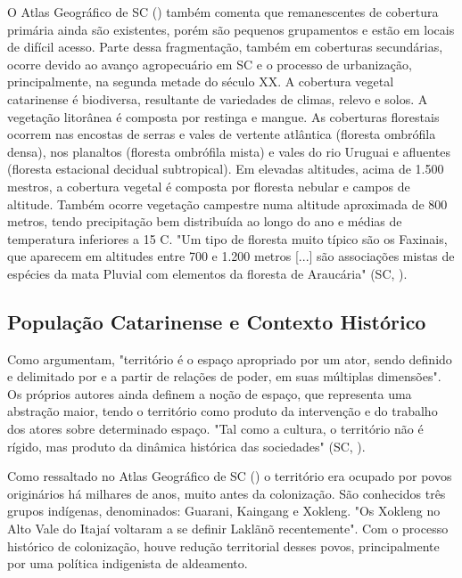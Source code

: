 \indent  O Atlas Geográfico de \acrlong{SC} (\citeyear{AtlasSCnatureza}) também comenta que remanescentes de cobertura primária ainda são existentes, porém são pequenos grupamentos e estão em locais de difícil acesso. Parte dessa fragmentação, também em coberturas secundárias, ocorre devido ao avanço agropecuário em \acrlong{SC} e o  processo de urbanização, principalmente, na segunda metade do século XX. A cobertura vegetal catarinense é biodiversa, resultante de variedades de climas, relevo e solos. A vegetação litorânea é composta por restinga e mangue. As coberturas florestais ocorrem nas encostas de serras e vales de vertente atlântica (floresta ombrófila densa), nos planaltos (floresta ombrófila mista) e vales do rio Uruguai e afluentes (floresta estacional decidual subtropical). Em elevadas altitudes, acima de 1.500 mestros, a cobertura vegetal é composta por floresta nebular e campos de altitude. Também ocorre vegetação campestre numa altitude aproximada de 800 metros, tendo precipitação bem distribuída ao longo do ano e médias de temperatura inferiores a 15 C. "Um tipo de floresta muito típico são os Faxinais, que aparecem em altitudes entre 700 e 1.200 metros [...] são associações mistas de espécies da mata Pluvial com elementos da floresta de Araucária" (\acrlong{SC}, \citeyear{AtlasSCnatureza}).

\subsection{População Catarinense e Contexto Histórico}

\indent Como  argumentam, "território é o espaço apropriado por um ator, sendo definido e delimitado por e a partir de relações de poder, em suas múltiplas dimensões". Os próprios autores ainda definem a noção de espaço, que representa uma abstração maior, tendo o território como produto da intervenção e do trabalho dos atores sobre determinado espaço. "Tal como a cultura, o território não é rígido, mas produto da dinâmica histórica das sociedades" (\acrlong{SC}, \citeyear{AtlasSCpopulacao}).

\indent Como ressaltado no Atlas Geográfico de \acrlong{SC} (\citeyear{AtlasSCpopulacao}) o território era ocupado por povos originários há milhares de anos, muito antes da colonização. São conhecidos três grupos indígenas, denominados: Guarani, Kaingang e Xokleng. "Os Xokleng no Alto Vale do Itajaí voltaram a se definir Laklãnõ recentemente". Com o processo histórico de colonização, houve redução  territorial desses povos, principalmente por uma política indigenista de aldeamento.

